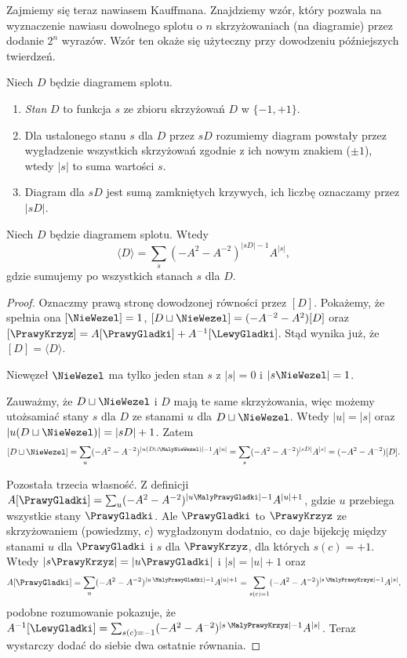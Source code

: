 Zajmiemy się teraz nawiasem Kauffmana.
Znajdziemy wzór, który pozwala na wyznaczenie nawiasu dowolnego splotu o $n$ skrzyżowaniach (na diagramie) przez dodanie $2^n$ wyrazów.
Wzór ten okaże się użyteczny przy dowodzeniu późniejszych twierdzeń.

\begin{definicja}
Niech $D$ będzie diagramem splotu.
\begin{enumerate}
\item \emph{Stan} $D$ to funkcja $s$ ze zbioru skrzyżowań $D$ w $\{-1, +1\}$.
\item Dla ustalonego stanu $s$ dla $D$ przez $sD$ rozumiemy diagram powstały przez wygładzenie wszystkich skrzyżowań zgodnie z ich nowym znakiem ($\pm 1$), wtedy $|s|$ to suma wartości $s$.
\item Diagram dla $sD$ jest sumą zamkniętych krzywych, ich liczbę oznaczamy przez $|sD|$.
\end{enumerate}
\end{definicja}

\begin{twierdzenie}
Niech $D$ będzie diagramem splotu.
Wtedy
\[\langle D\rangle = \sum_s (-A^2-A^{-2})^{|sD|-1} A^{|s|},\]
gdzie sumujemy po wszystkich stanach $s$ dla $D$.
\end{twierdzenie}

\begin{proof}
Oznaczmy prawą stronę dowodzonej równości przez $[D]$.
Pokażemy, że spełnia ona $[\NieWezel]=1$, $[D\sqcup\NieWezel]=(-A^{-2}-A^2) [D]$ oraz $[\PrawyKrzyz] = A [\PrawyGladki] + A^{-1}[\LewyGladki]$.
Stąd wynika już, że $[D] = \langle D \rangle$.

Niewęzeł $\NieWezel$ ma tylko jeden stan $s$ z $|s| = 0$ i $|s\NieWezel| = 1$.

Zauważmy, że $D \sqcup \NieWezel$ i $D$ mają te same skrzyżowania, więc możemy utożsamiać stany $s$ dla $D$ ze stanami $u$ dla $D \sqcup \NieWezel$.
Wtedy $|u| = |s|$ oraz $|u(D \sqcup \NieWezel)| = |sD| + 1$.
Zatem
\[
	[D \sqcup \NieWezel] = \sum_u (-A^2-A^{-2})^{|u(D\sqcup\MalyNieWezel)|-1} A^{|u|} =\sum_s (-A^2-A^{-2})^{|sD|} A^{|s|} = (-A^2-A^{-2}) [D].
\]

Pozostała trzecia własność. Z definicji $A[\PrawyGladki]=\sum_u(-A^2-A^{-2})^{|u\MalyPrawyGladki|-1}A^{|u|+1}$, gdzie $u$ przebiega wszystkie stany $\PrawyGladki$.
Ale $\PrawyGladki$ to $\PrawyKrzyz$ ze skrzyżowaniem (powiedzmy, $c$) wygładzonym dodatnio, co daje bijekcję między stanami $u$ dla $\PrawyGladki$ i $s$ dla $\PrawyKrzyz$, dla których $s(c) = + 1$.
Wtedy $|s\PrawyKrzyz|=|u\PrawyGladki|$ i $|s|=|u|+1$ oraz
\[
A[\PrawyGladki] = \sum_u (-A^2-A^{-2})^{|u\,\MalyPrawyGladki|-1}A^{|u|+1} = \sum_{s(c)=1}(-A^2-A^{-2})^{|s\,\MalyPrawyKrzyz|-1}A^{|s|},
\]
podobne rozumowanie pokazuje, że $A^{-1}[\LewyGladki] = \sum_{s(c)=-1}(-A^2-A^{-2})^{|s\,\MalyPrawyKrzyz|-1}A^{|s|}$. 
Teraz wystarczy dodać do siebie dwa ostatnie równania. %
\end{proof}

